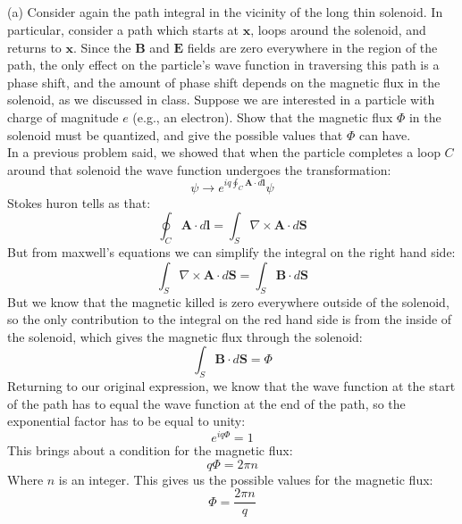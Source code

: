 \documentclass[12pt]{article}
\begin{document}
\subsection{}
(a) Consider again the path integral in the vicinity of the long thin solenoid. In particular, consider a path which starts at $\boldsymbol{x}$, loops around the solenoid, and returns to $\boldsymbol{x}$. Since the $\boldsymbol{B}$ and $\boldsymbol{E}$ fields are zero everywhere in the region of the path, the only effect on the particle's wave function in traversing this path is a phase shift, and the amount of phase shift depends on the magnetic flux in the solenoid, as we discussed in class. Suppose we are interested in a particle with charge of magnitude $e$ (e.g., an electron). Show that the magnetic flux $\Phi$ in the solenoid must be quantized, and give the possible values that $\Phi$ can have.\\
In a previous problem said, we showed that when the particle completes a loop $C$ around that solenoid the wave function undergoes the transformation:
\begin{equation}
\psi \rightarrow e^{i q \oint_C \boldsymbol{A} \cdot d \boldsymbol{l}} \psi
\end{equation}
Stokes huron tells as that:
\begin{equation}
\oint_C \boldsymbol{A} \cdot d \boldsymbol{l} = \int_S \nabla \times \boldsymbol{A} \cdot d \boldsymbol{S}
\end{equation}
But from maxwell's equations we can simplify the integral on the right hand side:
\begin{equation}
\int_S \nabla \times \boldsymbol{A} \cdot d \boldsymbol{S} = \int_S \boldsymbol{B} \cdot d \boldsymbol{S}
\end{equation}
But we know that the magnetic killed is zero everywhere outside of the solenoid, so the only contribution to the integral on the red hand side is from the inside of the solenoid, which gives the magnetic flux through the solenoid:
\begin{equation}
\int_S \boldsymbol{B} \cdot d \boldsymbol{S} = \Phi
\end{equation}
Returning to our original expression, we know that the wave function at the start of the path has to equal the wave function at the end of the path, so the exponential factor has to be equal to unity:
\begin{equation}
e^{i q \Phi} = 1
\end{equation}
This brings about a condition for the magnetic flux:
\begin{equation}
q \Phi = 2 \pi n
\end{equation}
Where $n$ is an integer. This gives us the possible values for the magnetic flux:
\begin{equation}
\Phi = \frac{2 \pi n}{q}
\end{equation}
\end{document}

